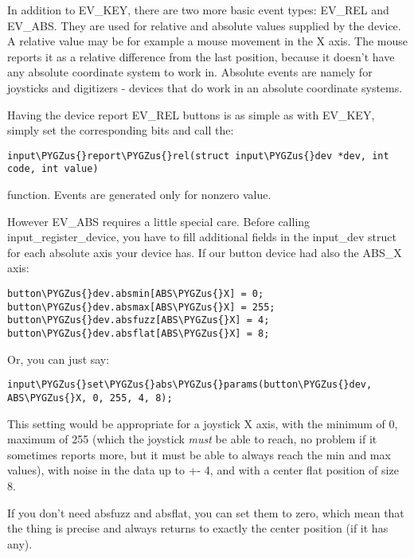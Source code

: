 \documentclass[a4paper,8pt,english]{sphinxmanual}
\def\PYGZus{\char`\_}
\begin{document}
In addition to EV\_KEY, there are two more basic event types: EV\_REL and
EV\_ABS. They are used for relative and absolute values supplied by the
device. A relative value may be for example a mouse movement in the X axis.
The mouse reports it as a relative difference from the last position,
because it doesn't have any absolute coordinate system to work in. Absolute
events are namely for joysticks and digitizers - devices that do work in an
absolute coordinate systems.

Having the device report EV\_REL buttons is as simple as with EV\_KEY, simply
set the corresponding bits and call the:

\begin{Verbatim}[commandchars=\\\{\}]
input\PYGZus{}report\PYGZus{}rel(struct input\PYGZus{}dev *dev, int code, int value)
\end{Verbatim}

function. Events are generated only for nonzero value.

However EV\_ABS requires a little special care. Before calling
input\_register\_device, you have to fill additional fields in the input\_dev
struct for each absolute axis your device has. If our button device had also
the ABS\_X axis:

\begin{Verbatim}[commandchars=\\\{\}]
button\PYGZus{}dev.absmin[ABS\PYGZus{}X] = 0;
button\PYGZus{}dev.absmax[ABS\PYGZus{}X] = 255;
button\PYGZus{}dev.absfuzz[ABS\PYGZus{}X] = 4;
button\PYGZus{}dev.absflat[ABS\PYGZus{}X] = 8;
\end{Verbatim}

Or, you can just say:

\begin{Verbatim}[commandchars=\\\{\}]
input\PYGZus{}set\PYGZus{}abs\PYGZus{}params(button\PYGZus{}dev, ABS\PYGZus{}X, 0, 255, 4, 8);
\end{Verbatim}

This setting would be appropriate for a joystick X axis, with the minimum of
0, maximum of 255 (which the joystick \emph{must} be able to reach, no problem if
it sometimes reports more, but it must be able to always reach the min and
max values), with noise in the data up to +- 4, and with a center flat
position of size 8.

If you don't need absfuzz and absflat, you can set them to zero, which mean
that the thing is precise and always returns to exactly the center position
(if it has any).
\end{document}

